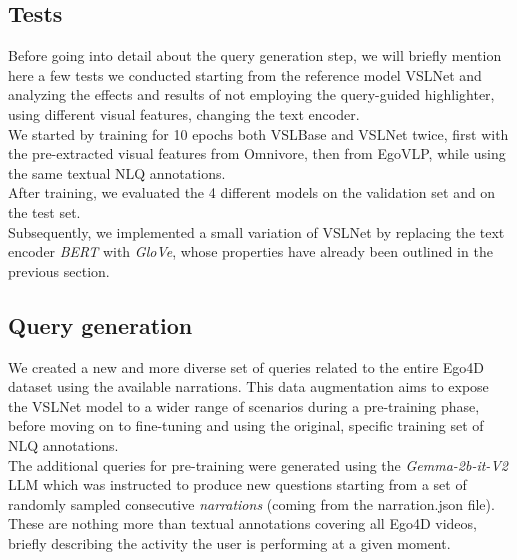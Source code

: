 \documentclass[10pt,twocolumn,letterpaper]{article}
\begin{document}
 \subsection{Tests}
Before going into detail about the query generation step, we will briefly mention here a few tests we conducted starting from the reference model VSLNet and analyzing the effects and results of not employing the query-guided highlighter, using different visual features, changing the text encoder. \\
We started by training for 10 epochs both VSLBase and VSLNet twice, first with the pre-extracted visual features from Omnivore, then from EgoVLP, while using the same textual NLQ annotations.\\
After training, we evaluated the 4 different models on the validation set and on the test set.\\
Subsequently, we implemented a small variation of VSLNet by replacing the text encoder \textit{BERT} with \textit{GloVe}, whose properties have already been outlined in the previous section.\\

\subsection{Query generation}
We created a new and more diverse set of queries related to the entire Ego4D dataset using the available narrations. This data augmentation aims to expose the VSLNet model to a wider range of scenarios during a pre-training phase, before moving on to fine-tuning and using the original, specific training set of NLQ annotations.\\ 
The additional queries for pre-training were generated using the \textit{Gemma-2b-it-V2} LLM which was instructed to produce new questions starting from a set of randomly sampled consecutive \textit{narrations} (coming from the narration.json file). These are nothing more than textual annotations covering all Ego4D videos, briefly describing the activity the user is performing at a given moment.
\end{document}
